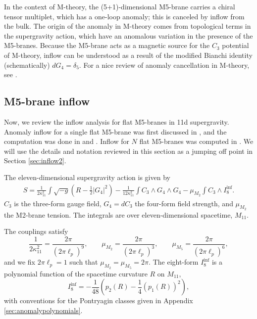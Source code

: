 \documentclass[a4paper,11pt]{article}
\newcommand{\ba}[1]{\begin{align} #1 \end{align} }
\begin{document}
In the context of M-theory, the (5+1)-dimensional M5-brane carries a chiral tensor multiplet, which has a one-loop anomaly; this is canceled by inflow from the bulk. 
The origin of the anomaly in M-theory  comes from topological terms in the supergravity action, which have an anomalous variation in the presence of the M5-branes. Because the M5-brane acts as a magnetic source for the $C_3$ potential of M-theory,  inflow can be understood as a result of the modified Bianchi identity (schematically) $dG_4=\delta_5$. For a nice review of anomaly cancellation in M-theory, see \cite{Bilal:2003es}. 




\subsection{M5-brane inflow}%
\label{sec:inflowreview}

Now, we review the inflow analysis for flat M5-branes in 11d supergravity. Anomaly inflow for a single flat M5-brane was first discussed in \cite{Duff:1995wd}, and the computation was done in \cite{Witten:1996hc} and \cite{Freed:1998tg}.  Inflow for $N$ flat M5-branes was computed in \cite{Harvey:1998bx}. We will use the details and notation reviewed in this section as a jumping off point in Section \ref{sec:inflow2}.

The eleven-dimensional supergravity action is given by
	\ba{
	S = \frac{1}{2\kappa_{11}^2} \int \sqrt{-g} \left( R - \frac{1}{2} |G_4|^2 \right)- \frac{1}{12 \kappa_{11}^2} \int C_3\wedge G_4 \wedge G_4 -\mu_{M_2} \int C_3\wedge I_8^{\text{inf}}.\label{eq:action}
	}
$C_3$ is the three-form gauge field, $G_4=dC_3$ the four-form field strength, and $\mu_{M_2}$ the M2-brane tension. The integrals are over eleven-dimensional spacetime, $M_{11}$. 

The couplings satisfy
	\begin{equation}
	\frac{1}{2\kappa_{11}^2} = \frac{2\pi}{(2\pi \ell_p)^9}, \qquad \mu_{M_2} = \frac{2\pi}{(2\pi \ell_p)^3}, \qquad \mu_{M_5} = \frac{2\pi}{(2\pi \ell_p)^6},
\end{equation} 
and we fix $2\pi \ell_p =1$ such that $\mu_{M_2}=\mu_{M_5}=2\pi$. The eight-form $I_8^{\text{inf}}$ is a polynomial function of the spacetime curvature $R$ on $M_{11}$, 
	\begin{equation}
	I_8^{\text{inf}} = - \frac{1}{48} \left( p_2(R) - \frac{1}{4} \left(p_1(R)\right)^2 \right),\label{eq:iinf}
	\end{equation}
with conventions for the Pontryagin classes given in Appendix \ref{sec:anomalypolynomials}.
\end{document}
